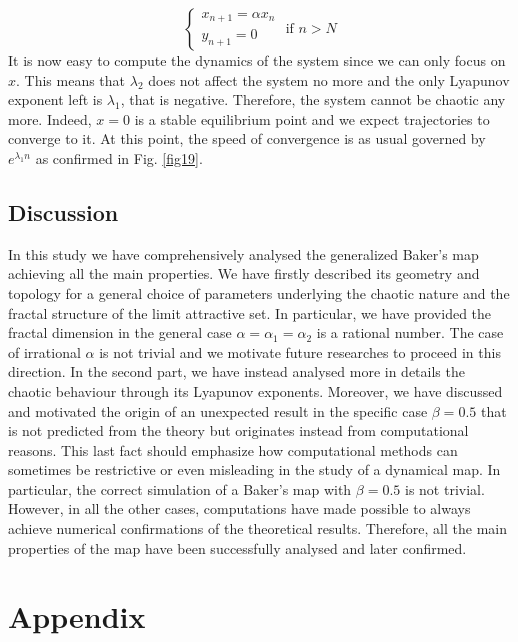 \documentclass[11pt,titlepage]{article}
\begin{document}
\begin{equation*}
	\begin{cases}
		x_{n+1} = \alpha x_n \\
		y_{n+1} = 0
	\end{cases}
 	\text{ if } n > N
\end{equation*}
It is now easy to compute the dynamics of the system since we can only focus on $x$.  This means that $\lambda_2$ does not affect the system no more and the only Lyapunov exponent left is $\lambda_1$, that is negative. Therefore, the system cannot be chaotic any more. Indeed, $x=0$ is a stable equilibrium point and we expect trajectories to converge to it. At this point, the speed of convergence is as usual governed by $e^{\lambda_1 n}$ as confirmed in Fig. \ref{fig19}.



\subsection{Discussion} %
In this study we have comprehensively analysed the generalized Baker's map achieving all the main properties. We have firstly described its geometry and topology for a general choice of parameters underlying the chaotic nature and the fractal structure of the limit attractive set. In particular, we have provided the fractal dimension in the general case $\alpha=\alpha_1=\alpha_2$ is a rational number. The case of irrational $\alpha$ is not trivial and we motivate future researches to proceed in this direction. In the second part, we have instead analysed more in details the chaotic behaviour through its Lyapunov exponents. Moreover, we have discussed and motivated the origin of an unexpected result in the specific case $\beta=0.5$ that is not predicted from the theory but originates instead from computational reasons. This last fact should emphasize how computational methods can sometimes be restrictive or even misleading in the study of a dynamical map. In particular, the correct simulation of a Baker's map with $\beta=0.5$ is not trivial. However, in all the other cases, computations have made possible to always achieve numerical confirmations of the theoretical results. Therefore, all the main properties of the map have been successfully analysed and later confirmed.




\clearpage
\appendix
\section*{Appendix}
\end{document}
